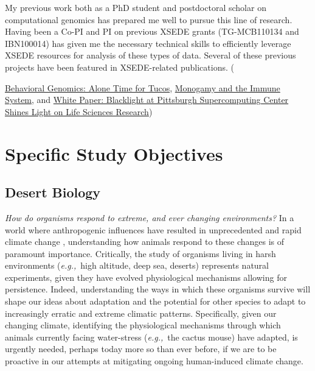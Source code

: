 \documentclass[10.5pt]{article}
\newcommand{\eg}{\textit{e.g.,}}
\begin{document}
\noindent
My previous work both as a PhD student and postdoctoral scholar on computational genomics has prepared me well to pursue this line of research. Having been a Co-PI and PI on previous XSEDE grants (TG-MCB110134 and IBN100014) has given me the necessary technical skills to efficiently leverage XSEDE resources for analysis of these types of data. Several of these previous projects have been featured in XSEDE-related publications. ({\href{http://goo.gl/3lXKf}{Behavioral Genomics: Alone Time for Tucos}, \href{http://goo.gl/fasl6}{Monogamy and the Immune System}, and \href{http://goo.gl/iGKSN}{White Paper: Blacklight at Pittsburgh Supercomputing Center Shines Light on Life Sciences Research})

\section*{Specific Study Objectives}

\subsection*{Desert Biology}
\emph{How do organisms respond to extreme, and ever changing environments?} In a world where anthropogenic influences have resulted in unprecedented and rapid climate change \citep{IPCC:2007uz}, understanding how animals respond to these changes is of paramount importance. Critically, the study of organisms living in harsh environments (\eg\ high altitude, deep sea, deserts) represents natural experiments, given they have evolved physiological mechanisms allowing for persistence. Indeed, understanding the ways in which these organisms survive will shape our ideas about adaptation and the potential for other species to adapt to increasingly erratic and extreme climatic patterns. Specifically, given our changing climate, identifying the physiological mechanisms through which animals currently facing water-stress (\eg\ the cactus mouse) have adapted, is urgently needed, perhaps today more so than ever before, if we are to be proactive in our attempts at mitigating ongoing human-induced climate change. 

}
\end{document}
